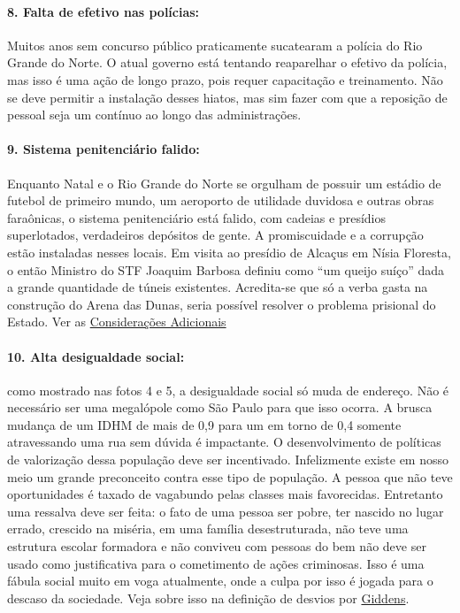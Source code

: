 \documentclass[
	12pt,				%
	openright,			%
	twoside,			%
	a4paper,			%
	chapter=TITLE,		%
	section=TITLE,		%
	subsection=TITLE,	%
	subsubsection=TITLE,%
	spanish,            %
	english,			%
	brazil				%
	]{abntex2}
\begin{document}
\paragraph*{\textbf{8. Falta de efetivo nas polícias:}} Muitos anos sem concurso público praticamente sucatearam a polícia do Rio Grande do Norte. O atual governo está tentando reaparelhar o efetivo da polícia, mas isso é uma ação de longo prazo, pois requer capacitação e treinamento. Não se deve permitir a instalação desses hiatos, mas sim fazer com que a reposição de pessoal seja um contínuo ao longo das administrações.
\hypertarget{W9}{}
\paragraph*{\textbf{9. Sistema penitenciário falido:}} Enquanto Natal e o Rio Grande do Norte se orgulham de possuir um estádio de futebol de primeiro mundo, um aeroporto de utilidade duvidosa e outras obras faraônicas, o sistema penitenciário está falido, com cadeias e presídios superlotados, verdadeiros depósitos de gente. A promiscuidade e a corrupção estão instaladas nesses locais. Em visita ao presídio de Alcaçus em Nísia Floresta, o então Ministro do STF Joaquim Barbosa definiu como “um queijo suíço” dada a grande quantidade de túneis existentes. Acredita-se que só a verba gasta na construção do Arena das Dunas, seria possível resolver o problema prisional do Estado. Ver as \hyperlink{CA1}{Considerações Adicionais}
\hypertarget{W10}{}
\paragraph*{\textbf{10. Alta desigualdade social:}} como mostrado nas fotos 4 e 5, a desigualdade social só muda de endereço. Não é necessário ser uma megalópole como São Paulo para que isso ocorra. A brusca mudança de um IDHM de mais de 0,9 para um em torno de 0,4 somente atravessando uma rua sem dúvida é impactante. O desenvolvimento de políticas de valorização dessa população deve ser incentivado. Infelizmente existe em nosso meio um grande preconceito contra esse tipo de população. A pessoa que não teve oportunidades é taxado de vagabundo pelas classes mais favorecidas. Entretanto uma ressalva deve ser feita: o fato de uma pessoa ser pobre, ter nascido no lugar errado, crescido na miséria, em uma família desestruturada, não teve uma estrutura escolar formadora e não conviveu com pessoas do bem não deve ser usado como justificativa para o cometimento de ações criminosas. Isso é uma fábula social muito em voga atualmente, onde a culpa por isso é jogada para o descaso da sociedade. Veja sobre isso na definição de desvios por \hyperlink{Gid1}{Giddens}.
\hypertarget{W11}{}
\end{document}
